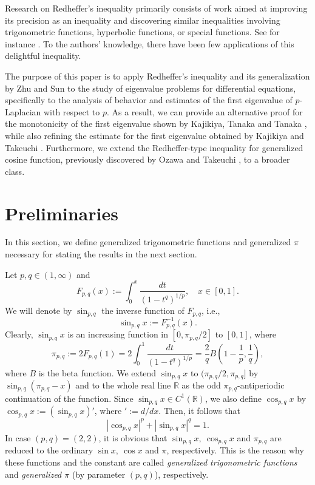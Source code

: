 \documentclass[12pt]{amsart}
\numberwithin{equation}{section}
\theoremstyle{plain}
\theoremstyle{definition}
\theoremstyle{remark}
\begin{document}
Research on Redheffer's inequality primarily consists of work aimed at improving its precision as an inequality and discovering similar inequalities involving trigonometric functions, hyperbolic functions, or special functions. See for instance \cites{B2007,ZS2008,Z2009,OT2021}. To the authors' knowledge, there have been few applications of this delightful inequality. 

The purpose of this paper is to apply Redheffer's inequality 
and its generalization by Zhu and Sun \cite{ZS2008} 
to the study of eigenvalue problems for differential equations, specifically to  
the analysis of behavior and estimates of the first eigenvalue of $p$-Laplacian with respect to $p$. 
As a result, we can provide an alternative proof for the monotonicity of the first eigenvalue shown by Kajikiya, Tanaka and Tanaka \cite{KTT2017}, 
while also refining the estimate for the first eigenvalue obtained by Kajikiya and Takeuchi \cite{KT2025}.
Furthermore, we extend the Redheffer-type inequality for generalized cosine function, previously discovered by Ozawa and Takeuchi \cite{OT2021}, to a broader class.




\section{Preliminaries}


In this section, we define generalized trigonometric functions and 
generalized $\pi$ necessary for stating the results in the next section.

Let $p,q \in (1,\infty)$ and 
$$F_{p,q}(x):=\int_0^x \frac{dt}{(1-t^q)^{1/p}}, \quad x \in [0,1].$$
We will denote by $\sin_{p,q}$ the inverse function of $F_{p,q}$, i.e.,
$$\sin_{p,q}{x}:=F_{p,q}^{-1}(x).$$
Clearly, $\sin_{p,q}{x}$ is an increasing function in $[0,\pi_{p,q}/2]$ to $[0,1]$,
where
$$\pi_{p,q}:=2F_{p,q}(1)=2\int_0^1 \frac{dt}{(1-t^q)^{1/p}}
=\frac{2}{q}B\left(1-\frac{1}{p},\frac{1}{q}\right),$$
where $B$ is the beta function.
We extend $\sin_{p,q}{x}$ to $(\pi_{p,q}/2,\pi_{p,q}]$ by $\sin_{p,q}{(\pi_{p,q}-x)}$
and to the whole real line $\mathbb{R}$ as the odd $\pi_{p,q}$-antiperiodic 
continuation of the function. 
Since $\sin_{p,q}{x} \in C^1(\mathbb{R})$,
we also define $\cos_{p,q}{x}$ by $\cos_{p,q}{x}:=(\sin_{p,q}{x})'$,
where ${}':=d/dx$.
Then, it follows that 
$$|\cos_{p,q}{x}|^p+|\sin_{p,q}{x}|^q=1.$$
In case $(p,q)=(2,2)$, it is obvious that $\sin_{p,q}{x},\ \cos_{p,q}{x}$ 
and $\pi_{p,q}$ are reduced to the ordinary $\sin{x},\ \cos{x}$ and $\pi$,
respectively. 
This is the reason why these functions and the constant are called
\textit{generalized trigonometric functions} 
and \textit{generalized $\pi$} (by parameter $(p,q)$), respectively. 
\end{document}
